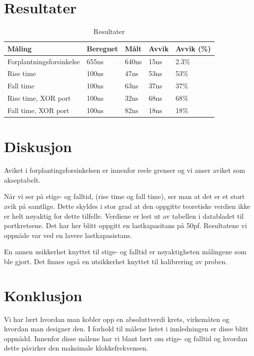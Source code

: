 \documentclass{article}
\begin{document}
\section{Resultater}
\begin{table}[h]
	\centering
	\caption{Resultater}
	\label{my-label}
	\vspace{0.2cm}
	\begin{tabular}{| l | l | l | l | l |} \hline
	Måling & Beregnet & Målt & Avvik & Avvik (\%) \\ \hline
	Forplantningsforsinkelse & 655ns                  & 640ns         & 15ns         & 2.3\%             \\ \hline
	Rise time                & 100ns                  & 47ns          & 53ns         & 53\%              \\ \hline
	Fall time                & 100ns                  & 63ns          & 37ns         & 37\%              \\ \hline
	Rise time, XOR port      & 100ns                  & 32ns          & 68ns         & 68\%              \\ \hline
	Fall time, XOR port      & 100ns                  & 82ns          & 18ns         & 18\%		     	 \\ \hline
	\end{tabular}
\end{table}

\section{Diskusjon}
Aviket i forplantingsforsinkelsen er innenfor reele grenser og vi anser aviket som akseptabelt.



Når vi ser på stige- og falltid, (rise time og fall time), ser man at det er et stort avik på samtlige. Dette skyldes i stor grad at den oppgitte teoretiske verdien ikke er helt nøyaktig for dette tilfelle. Verdiene er lest ut av tabellen i databladet til portkretsene. Det har her blitt oppgitt en lastkapasitans på 50pf. Resultatene vi oppnåde var ved en lavere lastkapasistans.

En annen usikkerhet knyttet til stige- og falltid er nøyaktigheten målingene som ble gjort. Det finnes også en utsikkerhet knyttet til kalibrering av proben.

\section{Konklusjon}
Vi har lært hvordan man kobler opp en absoluttverdi krets, virkemåten og hvordan man designer den. I forhold til målene listet i innledningen er disse blitt oppnådd. Innenfor disse målene har vi blant lært om stige- og falltid og hvordan dette påvirker den maksimale klokkefrekvensen.
\end{document}
